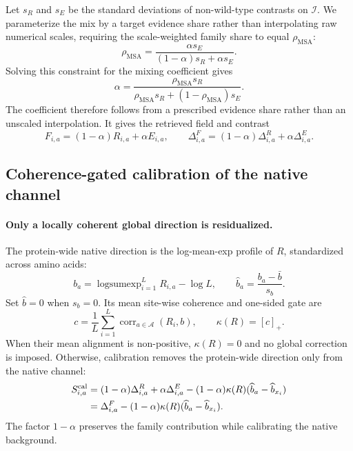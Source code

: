 \documentclass{article} %
\begin{document}
Let $s_R$ and $s_E$ be the standard deviations of non-wild-type contrasts on $\mathcal I$. We parameterize the mix by a target evidence share rather than interpolating raw numerical scales, requiring the scale-weighted family share to equal $\rho_{\mathrm{MSA}}$:
\begin{equation}
\rho_{\mathrm{MSA}}
=\frac{\alpha s_E}{(1-\alpha)s_R+\alpha s_E}.
\label{eq:amplitude_share}
\end{equation}
Solving this constraint for the mixing coefficient gives
\begin{equation}
\alpha
=\frac{\rho_{\mathrm{MSA}}s_R}
{\rho_{\mathrm{MSA}}s_R+(1-\rho_{\mathrm{MSA}})s_E}.
\label{eq:native_alpha}
\end{equation}
The coefficient therefore follows from a prescribed evidence share rather than an unscaled interpolation. It gives the retrieved field and contrast
\begin{equation}
F_{i,a}=(1-\alpha)R_{i,a}+\alpha E_{i,a},
\qquad
\Delta^F_{i,a}=(1-\alpha)\Delta^R_{i,a}+\alpha\Delta^E_{i,a}.
\label{eq:fusion}
\end{equation}

\subsection{Coherence-gated calibration of the native channel}
\label{sec:bias}
\label{sec:calibration}

\paragraph{Only a locally coherent global direction is residualized.}
The protein-wide native direction is the log-mean-exp profile of $R$, standardized across amino acids:
\begin{equation}
b_a=\operatorname{logsumexp}_{i=1}^{L}R_{i,a}-\log L,
\qquad
\widehat b_a=\frac{b_a-\bar b}{s_b}.
\label{eq:background}
\end{equation}
Set $\widehat b=0$ when $s_b=0$. Its mean site-wise coherence and one-sided gate are
\begin{equation}
c=\frac{1}{L}\sum_{i=1}^{L}\operatorname{corr}_{a\in\mathcal A}(R_i,b),
\qquad
\kappa(R)=[c]_+.
\label{eq:gate}
\end{equation}
When their mean alignment is non-positive, $\kappa(R)=0$ and no global correction is imposed. Otherwise, calibration removes the protein-wide direction only from the native channel:
\begin{align}
S^{\mathrm{cal}}_{i,a}
&=(1-\alpha)\Delta^R_{i,a}+\alpha\Delta^E_{i,a}
 -(1-\alpha)\kappa(R)(\widehat b_a-\widehat b_{x_i})\notag\\
&=\Delta^F_{i,a}-(1-\alpha)\kappa(R)(\widehat b_a-\widehat b_{x_i}).
\label{eq:calibrated}
\end{align}
The factor $1-\alpha$ preserves the family contribution while calibrating the native background.
\end{document}
